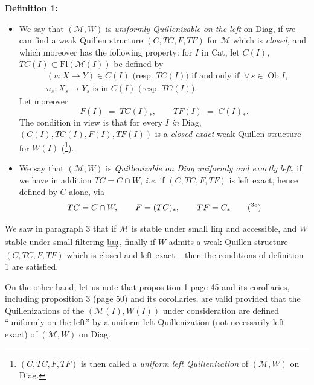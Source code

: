 \textbf{Definition 1:}

\begin{itemize}[leftmargin=2.5em]
\item[\circled{a}] We say that $(\mathcal{M},W)$ is \textit{uniformly Quillenizable on the left} on Diag, if we can find a weak Quillen structure $(C,TC,F,TF)$ for $\mathcal{M}$ which is \textit{closed,} and which moreover has the following property: for $I$ in Cat, let $C(I)$, $TC(I) \subset \mathrm{Fl}(\mathcal{M}(I))$ be defined by
\[ \begin{aligned} &(u : X \longrightarrow Y) \in C(I) \text{ (resp. } TC(I)) \text{ if and only if } \ \forall\, s \in \operatorname{Ob} I, \\ &u_{s} : X_{s} \longrightarrow Y_{s} \text{ is in } C(I) \text{ (resp. } TC(I)). \end{aligned} \]
Let moreover
\[ F(I) \;=\; TC(I)_{*}, \qquad TF(I) \;=\; C(I)_{*}. \]
The condition in view is that for every $I$ \textit{in} Diag, $(C(I),TC(I),F(I),TF(I))$ is a \textit{closed exact} weak Quillen structure for $W(I)$ (\footnote[34]{$(C,TC,F,TF)$ is then called a \textit{uniform left Quillenization} of $(\mathcal{M},W)$ on Diag.}).

\item[\circled{b}] We say that $(\mathcal{M},W)$ is \textit{Quillenizable on Diag uniformly and exactly} \textit{left}, if we have in addition $TC = C \cap W$, \textit{i.e.} if $(C,TC,F,TF)$ is left exact, hence defined by $C$ alone, via
\[ TC = C \cap W, \qquad F = (TC)_{*}, \qquad TF = C_{*} \qquad \text{(\footnotemark[35])} \]
\end{itemize}

We saw in paragraph 3 that if $\mathcal{M}$ is stable under small $\varinjlim$ and accessible, and $W$ stable under small filtering $\varinjlim$, finally if
$W$ admits a weak Quillen structure $(C,TC,F,TF)$ which is closed and left exact -- then the conditions of definition 1 are satisfied.

On the other hand, let us note that proposition 1 page 45 and its corollaries, including proposition 3 (page 50) and its corollaries, are valid provided that the Quillenizations of the $(\mathcal{M}(I),W(I))$ under consideration are defined ``uniformly on the left'' by a uniform left Quillenization (not necessarily left exact) of $(\mathcal{M},W)$ on Diag.

